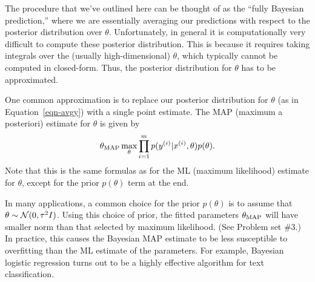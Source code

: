 \documentclass{article}
\begin{document}
The procedure that we've outlined here can be thought of as the ``fully Bayesian prediction,''
where we are essentially averaging our predictions with respect to the posterior distribution over 
$\theta$.  Unfortunately, in general it is computationally very difficult to compute these
posterior distribution.  This is because it requires taking 
integrals over the (usually high-dimensional) $\theta$, which typically cannot be 
computed in closed-form.  Thus, the posterior distribution for $\theta$ has to be approximated.

One common approximation is to replace our posterior distribution for $\theta$
(as in Equation~\ref{eqn-avgy}) with a single point estimate.  The MAP (maximum a posteriori)
estimate for $\theta$ is given by 
\begin{equation}
\theta_{\rm MAP} \max_\theta \prod_{i=1}^m p({y^{(i)}} | {x^{(i)}}, \theta) p(\theta).
\end{equation}
Note that this is the same formulas as for the ML (maximum likelihood) estimate for $\theta$,
except for the prior $p(\theta)$ term at the end.  

In many applications, a common choice for the prior $p(\theta)$ is to assume that
$\theta \sim {\cal N}(0, \tau^2 I)$.   Using this choice of prior, the fitted parameters
$\theta_{\rm MAP}$ will have smaller norm than that selected by maximum likelihood.
(See Problem set \#3.)  
In practice, this causes the Bayesian MAP estimate to be less
susceptible to overfitting than the ML estimate of the parameters.  For example,
Bayesian logistic regression turns out to be a highly effective algorithm for 
text classification. 
\end{document}
